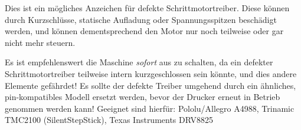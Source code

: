 Dies ist ein mögliches Anzeichen für defekte Schrittmotortreiber. Diese können durch Kurzschlüsse, statische Aufladung oder Spannungsspitzen beschädigt werden, und können dementsprechend den Motor nur noch teilweise oder gar nicht mehr steuern.

Es ist empfehlenswert die Maschine \emph{sofort} aus zu schalten, da ein defekter Schrittmotortreiber teilweise intern kurzgeschlossen sein könnte, und dies andere Elemente gefährdet! Es sollte der defekte Treiber umgehend durch ein ähnliches, pin-kompatibles Modell ersetzt werden, bevor der Drucker erneut in Betrieb genommen werden kann!
Geeignet sind hierfür: Pololu/Allegro A4988, Trinamic TMC2100 (SilentStepStick), Texas Instruments DRV8825